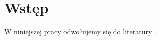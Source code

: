 \documentclass{memoir}
\begin{document}
\chapter{Wstęp}
W niniejszej pracy odwołujemy się do literatury \cite{sample2024}.


\printbibliography
\end{document}
